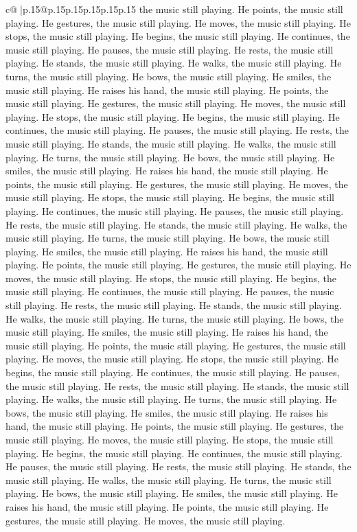 \documentclass{article}
\begin{document}
{\begin{supertabular}{c@{$\;$}|p{.15\linewidth}@{}p{.15\linewidth}p{.15\linewidth}p{.15\linewidth}p{.15\linewidth}p{.15\linewidth}}
{{{the music still playing. He points, the music still playing. He gestures, the music still playing. He moves, the music still playing. He stops, the music still playing. He begins, the music still playing. He continues, the music still playing. He pauses, the music still playing. He rests, the music still playing. He stands, the music still playing. He walks, the music still playing. He turns, the music still playing. He bows, the music still playing. He smiles, the music still playing. He raises his hand, the music still playing. He points, the music still playing. He gestures, the music still playing. He moves, the music still playing. He stops, the music still playing. He begins, the music still playing. He continues, the music still playing. He pauses, the music still playing. He rests, the music still playing. He stands, the music still playing. He walks, the music still playing. He turns, the music still playing. He bows, the music still playing. He smiles, the music still playing. He raises his hand, the music still playing. He points, the music still playing. He gestures, the music still playing. He moves, the music still playing. He stops, the music still playing. He begins, the music still playing. He continues, the music still playing. He pauses, the music still playing. He rests, the music still playing. He stands, the music still playing. He walks, the music still playing. He turns, the music still playing. He bows, the music still playing. He smiles, the music still playing. He raises his hand, the music still playing. He points, the music still playing. He gestures, the music still playing. He moves, the music still playing. He stops, the music still playing. He begins, the music still playing. He continues, the music still playing. He pauses, the music still playing. He rests, the music still playing. He stands, the music still playing. He walks, the music still playing. He turns, the music still playing. He bows, the music still playing. He smiles, the music still playing. He raises his hand, the music still playing. He points, the music still playing. He gestures, the music still playing. He moves, the music still playing. He stops, the music still playing. He begins, the music still playing. He continues, the music still playing. He pauses, the music still playing. He rests, the music still playing. He stands, the music still playing. He walks, the music still playing. He turns, the music still playing. He bows, the music still playing. He smiles, the music still playing. He raises his hand, the music still playing. He points, the music still playing. He gestures, the music still playing. He moves, the music still playing. He stops, the music still playing. He begins, the music still playing. He continues, the music still playing. He pauses, the music still playing. He rests, the music still playing. He stands, the music still playing. He walks, the music still playing. He turns, the music still playing. He bows, the music still playing. He smiles, the music still playing. He raises his hand, the music still playing. He points, the music still playing. He gestures, the music still playing. He moves, the music still playing. }}}
\end{supertabular}}
\end{document}

